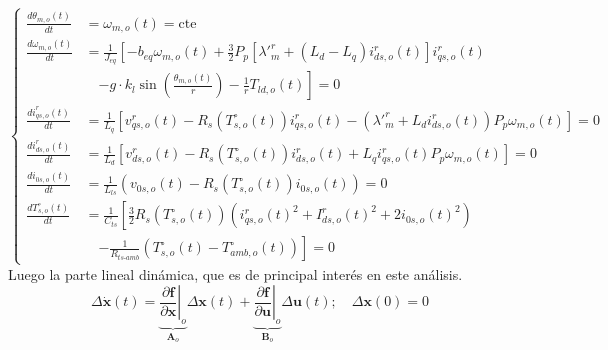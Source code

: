 \documentclass[12pt, a4paper,journal, onecolumn, compsoc]{IEEEtran}
\begin{document}
\begin{equation}
\left\{
    \begin{aligned}
        \frac{d\theta_{m,o}(t)}{dt} &= \omega_{m,o}(t) = \text{cte} \\[10pt]
        \frac{d\omega_{m,o}(t)}{dt} &= \frac{1}{J_{eq}} \left[ -b_{eq}\omega_{m,o}(t) + \frac{3}{2}P_p \left[ \lambda'^r_m + (L_d - L_q)i^r_{ds,o}(t) \right] i^r_{qs,o}(t) \right. \\
        &\quad \left. - g \cdot k_l \sin\left(\frac{\theta_{m,o}(t)}{r}\right) - \frac{1}{r}T_{ld,o}(t) \right] = 0 \\[10pt]
        \frac{di^r_{qs,o}(t)}{dt} &= \frac{1}{L_q} \left[ v^r_{qs,o}(t) - R_s(T_{s,o}^\circ(t))i^r_{qs,o}(t) - (\lambda'^r_m + L_d  i^r_{ds,o}(t))P_p \omega_{m,o}(t) \right] = 0 \\[10pt]
        \frac{di^r_{ds,o}(t)}{dt} &= \frac{1}{L_d} \left[ v^r_{ds,o}(t) - R_s(T_{s,o}^\circ(t))i^r_{ds,o}(t) + L_q i^r_{qs,o}(t)P_p \omega_{m,o}(t) \right] = 0 \\[10pt]
        \frac{di_{0s,o}(t)}{dt} &= \frac{1}{L_{ls}} \left( v_{0s,o}(t) - R_s(T_{s,o}^\circ(t))i_{0s,o}(t) \right) = 0 \\[10pt]
        \frac{dT_{s,o}^\circ(t)}{dt} &= \frac{1}{C_{ts}} \left[ \frac{3}{2}R_s(T_{s,o}^\circ(t)) \left( i^r_{qs,o}(t)^2 + I^r_{ds,o}(t)^2 + 2i_{0s,o}(t)^2 \right) \right. \\
        &\quad \left. - \frac{1}{R_{ts\text{-}amb}} (T_{s,o}^\circ(t) - T_{amb,o}^\circ(t)) \right] = 0
    \end{aligned}
\right.
\end{equation}
Luego la parte lineal dinámica, que es de principal interés en este análisis.
\begin{equation*}
    \Delta\bm{\dot x}(t) = \underbrace{\left. \frac{\partial \bm f}{\partial \bm x} \right|_o}_{\bm A_o}\Delta\bm x(t) + \underbrace{\left. \frac{\partial \bm f}{\partial \bm u} \right|_o}_{\bm B_o}\Delta\bm u(t); \quad \Delta\bm x(0) = 0
\end{equation*}
\end{document}
